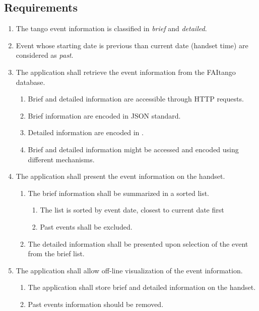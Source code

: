 \documentclass[10pt, twoside]{article}
\newcommand{\todo}[1]{{\color{red}{TODO: \textbf{\footnotesize{#1}}}}}
\begin{document}
\subsection*{Requirements}
\begin{enumerate}
    \item The tango event information is classified 
          in \emph{brief} and \emph{detailed}.
    \item Event whose starting date is previous than current date 
          (handset time) are considered as \emph{past}.
    \item The application shall retrieve the event information from the 
          FAItango database.
    \begin{enumerate}
        \item Brief and detailed information are accessible through 
              HTTP requests.
        \item Brief information are encoded in JSON standard.
        \item Detailed information are encoded in \todo{what?}.
        \item Brief and detailed information might be accessed and encoded using
              different mechanisms.
    \end{enumerate}
    \item The application shall present the event information on the handset.
    \begin{enumerate}
        \item The brief information shall be summarized in a sorted list.
        \begin{enumerate}
            \item The list is sorted by event date, closest to current date 
                  first
            \item Past events shall be excluded.
        \end{enumerate}
        \item The detailed information shall be presented upon selection of
              the event from the brief list.
    \end{enumerate}
    \item The application shall allow off-line visualization of the event 
          information.
    \begin{enumerate}
        \item The application shall store brief and detailed information 
              on the handset.
        \item Past events information should be removed.

\end{enumerate}
\end{enumerate}
\end{document}
